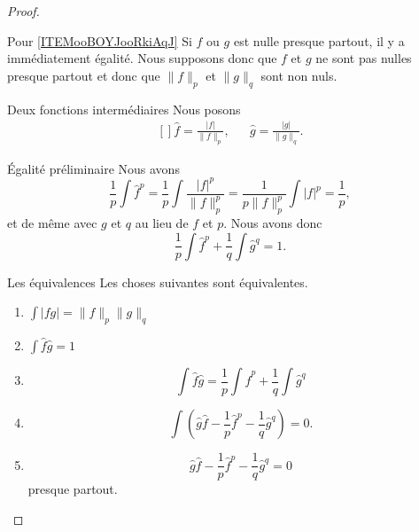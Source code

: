 \begin{proof}
\begin{subproof}
\item[Pour \ref{ITEMooBOYJooRkiAqJ}]
    Si \( f\) ou \( g\) est nulle presque partout, il y a immédiatement égalité. Nous supposons donc que \( f\) et \( g\) ne sont pas nulles presque partout et donc que \( \| f \|_p\) et \( \| g \|_q\) sont non nuls.
    \begin{subproof}
    \item[Deux fonctions intermédiaires]
    Nous posons
        \begin{equation}
            \begin{aligned}[]
                \hat f=\frac{ | f | }{ \| f \|_p },&&\hat g=\frac{ | g | }{ \| g \|_q }.
            \end{aligned}
        \end{equation}
    \item[Égalité préliminaire]
        Nous avons
        \begin{equation}
            \frac{1}{ p }\int\hat f^p=\frac{1}{ p }\int\frac{ | f |^p }{ \| f \|_p^p }=\frac{1}{ p\| f \|_p^p }\int| f |^p=\frac{1}{ p },
        \end{equation}
        et de même avec \( g\) et \( q\) au lieu de \( f\) et \( p\). Nous avons donc
        \begin{equation}
            \frac{1}{ p }\int\hat f^p+\frac{1}{ q }\int\hat g^q=1.
        \end{equation}
    \item[Les équivalences]
        Les choses suivantes sont équivalentes.
        \begin{enumerate}
            \item
                \( \int | fg |=\| f \|_p\| g \|_q\)
            \item
                $\int\hat f\hat g=1$
            \item
                \begin{equation}
                    \int\hat f\hat g=\frac{1}{ p }\int \hat f^p+\frac{1}{ q }\int\hat g^q
                \end{equation}
            \item
                \begin{equation}
                    \int\left( \hat g\hat f-\frac{1}{ p }\hat f^p-\frac{1}{ q }\hat g^q \right)=0.
                \end{equation}
            \item
                \begin{equation}
                     \hat g\hat f-\frac{1}{ p }\hat f^p-\frac{1}{ q }\hat g^q=0
                \end{equation}
                presque partout.


\end{enumerate}
\end{subproof}
\end{subproof}
\end{proof}
